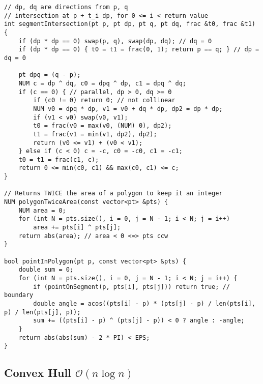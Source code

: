 \documentclass{article}
\begin{document}
\begin{lstlisting}
// dp, dq are directions from p, q
// intersection at p + t_i dp, for 0 <= i < return value
int segmentIntersection(pt p, pt dp, pt q, pt dq, frac &t0, frac &t1)
{
	if (dp * dp == 0) swap(p, q), swap(dp, dq); // dq = 0
	if (dp * dp == 0) { t0 = t1 = frac(0, 1); return p == q; } // dp = dq = 0

	pt dpq = (q - p);
	NUM c = dp ^ dq, c0 = dpq ^ dp, c1 = dpq ^ dq;
	if (c == 0) { // parallel, dp > 0, dq >= 0
		if (c0 != 0) return 0; // not collinear
		NUM v0 = dpq * dp, v1 = v0 + dq * dp, dp2 = dp * dp;
		if (v1 < v0) swap(v0, v1);
		t0 = frac(v0 = max(v0, (NUM) 0), dp2);
		t1 = frac(v1 = min(v1, dp2), dp2);
		return (v0 <= v1) + (v0 < v1);
	} else if (c < 0) c = -c, c0 = -c0, c1 = -c1;
	t0 = t1 = frac(c1, c);
	return 0 <= min(c0, c1) && max(c0, c1) <= c;
}

// Returns TWICE the area of a polygon to keep it an integer
NUM polygonTwiceArea(const vector<pt> &pts) {
	NUM area = 0;
	for (int N = pts.size(), i = 0, j = N - 1; i < N; j = i++)
		area += pts[i] ^ pts[j];
	return abs(area); // area < 0 <=> pts ccw
}

bool pointInPolygon(pt p, const vector<pt> &pts) {
	double sum = 0;
	for (int N = pts.size(), i = 0, j = N - 1; i < N; j = i++) {
		if (pointOnSegment(p, pts[i], pts[j])) return true; // boundary
		double angle = acos((pts[i] - p) * (pts[j] - p) / len(pts[i], p) / len(pts[j], p));
		sum += ((pts[i] - p) ^ (pts[j] - p)) < 0 ? angle : -angle;
	}
	return abs(abs(sum) - 2 * PI) < EPS;
}
\end{lstlisting}

\begin{comment}
// Assumption: polygon has unique points
// 0: no, 1: yes, 2: on boundary
int pointInConvex(pt p, const vector<pt> &pts) {
bool onBoundary = false;
for (int N = pts.size(), sgn = 0, i = 0, j = N - 1; i < N; j = i++) {
NUM cross = (pts[i] - p) ^ (pts[j] - p);
int s = (cross > 0) - (cross < 0);
if (cross == 0) onBoundary = true;
else if (sgn == 0) sgn = s;
else if (sgn != s) return 0;
}
return onBoundary ? 2 : 1;
}
\end{comment}

\subsection{Convex Hull $\mathcal{O}(n \log n)$}
\end{document}
